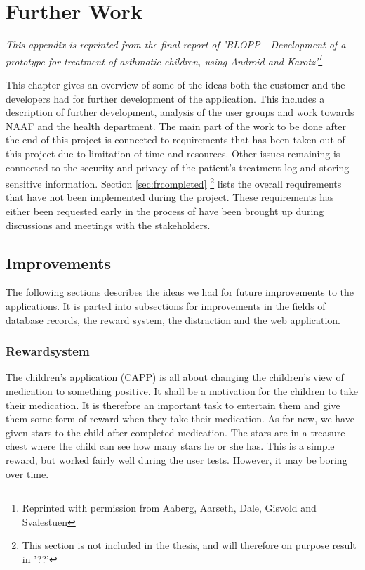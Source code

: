 \chapter{Further Work}
\label{app:furtherWork}


\emph{This appendix is reprinted from the final report of 'BLOPP - Development of a prototype for treatment of asthmatic children, using Android and Karotz'\footnote{Reprinted with permission from Aaberg, Aarseth, Dale, Gisvold and Svalestuen} \cite{CustomerDriven}}


This chapter gives an overview of some of the ideas both the customer and the developers had for further development of the application. This includes a description of further development, analysis of the user groups and work towards NAAF and the health department.
The main part of the work to be done after the end of this project is connected to requirements that has been taken out of this project due to limitation of time and resources. Other issues remaining is connected to the security and privacy of the patient's treatment log and storing sensitive information.
Section \ref{sec:frcompleted} \footnote{This section is not included in the thesis, and will therefore on purpose result in '??'} lists the overall requirements that have not been implemented during the project. These requirements has either been requested early in the process of have been brought up during discussions and meetings with the stakeholders. 


\section{Improvements}
\label{sec:Improvements}
The following sections describes the ideas we had for future improvements to the applications. It is parted into subsections for improvements in the fields of database records, the reward system, the distraction and the web application.

%
%

\subsection{Rewardsystem}
The children's application (CAPP) is all about changing the children's view of medication to something positive. It shall be a motivation for the children to take their medication. It is therefore an important task to entertain them and give them some form of reward when they take their medication. As for now, we have given stars to the child after completed medication. The stars are in a treasure chest where the child can see how many stars he or she has. This is a simple reward, but worked fairly well during the user tests. However, it may be boring over time. 

